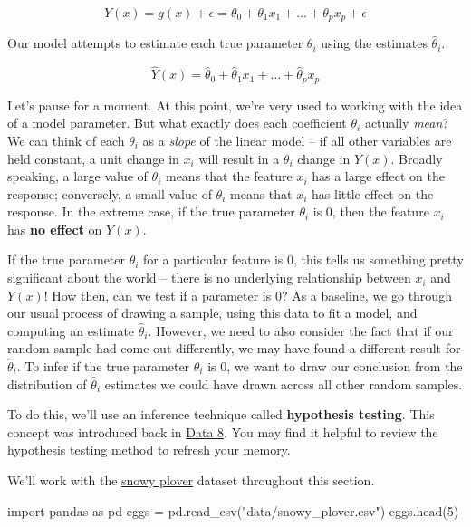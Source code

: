 \documentclass[
  letterpaper,
  DIV=11,
  numbers=noendperiod]{scrreprt}
\newenvironment{Shaded}{\begin{snugshade}}{\end{snugshade}}
\newcommand{\DecValTok}[1]{\textcolor[rgb]{0.68,0.00,0.00}{#1}}
\newcommand{\ImportTok}[1]{\textcolor[rgb]{0.00,0.46,0.62}{#1}}
\newcommand{\NormalTok}[1]{\textcolor[rgb]{0.00,0.23,0.31}{#1}}
\newcommand{\OperatorTok}[1]{\textcolor[rgb]{0.37,0.37,0.37}{#1}}
\newcommand{\StringTok}[1]{\textcolor[rgb]{0.13,0.47,0.30}{#1}}
\begin{document}
\[Y(x) = g(x) + \epsilon = \theta_0 + \theta_1 x_1 + \ldots + \theta_p x_p + \epsilon\]

Our model attempts to estimate each true parameter \(\theta_i\) using
the estimates \(\hat{\theta}_i\).

\[\hat{Y}(x) = \hat{\theta}_0 + \hat{\theta}_1 x_1 + \ldots + \hat{\theta}_p x_p\]

Let's pause for a moment. At this point, we're very used to working with
the idea of a model parameter. But what exactly does each coefficient
\(\theta_i\) actually \emph{mean}? We can think of each \(\theta_i\) as
a \emph{slope} of the linear model -- if all other variables are held
constant, a unit change in \(x_i\) will result in a \(\theta_i\) change
in \(Y(x)\). Broadly speaking, a large value of \(\theta_i\) means that
the feature \(x_i\) has a large effect on the response; conversely, a
small value of \(\theta_i\) means that \(x_i\) has little effect on the
response. In the extreme case, if the true parameter \(\theta_i\) is 0,
then the feature \(x_i\) has \textbf{no effect} on \(Y(x)\).

If the true parameter \(\theta_i\) for a particular feature is 0, this
tells us something pretty significant about the world -- there is no
underlying relationship between \(x_i\) and \(Y(x)\)! How then, can we
test if a parameter is 0? As a baseline, we go through our usual process
of drawing a sample, using this data to fit a model, and computing an
estimate \(\hat{\theta}_i\). However, we need to also consider the fact
that if our random sample had come out differently, we may have found a
different result for \(\hat{\theta}_i\). To infer if the true parameter
\(\theta_i\) is 0, we want to draw our conclusion from the distribution
of \(\hat{\theta}_i\) estimates we could have drawn across all other
random samples.

To do this, we'll use an inference technique called \textbf{hypothesis
testing}. This concept was introduced back in
\href{https://inferentialthinking.com/chapters/11/Testing_Hypotheses.html}{Data
8}. You may find it helpful to review the hypothesis testing method to
refresh your memory.

We'll work with the
\href{https://www.audubon.org/field-guide/bird/snowy-plover}{snowy
plover} dataset throughout this section.

\begin{Shaded}
\begin{Highlighting}[]
\ImportTok{import}\NormalTok{ pandas }\ImportTok{as}\NormalTok{ pd}
\NormalTok{eggs }\OperatorTok{=}\NormalTok{ pd.read\_csv(}\StringTok{"data/snowy\_plover.csv"}\NormalTok{)}
\NormalTok{eggs.head(}\DecValTok{5}\NormalTok{)}
\end{Highlighting}
\end{Shaded}
\end{document}
